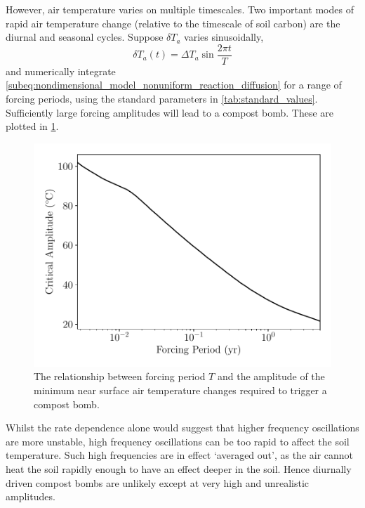 However, air temperature varies on multiple timescales. Two important modes of rapid air temperature change (relative to the timescale of soil
carbon) are the diurnal and seasonal cycles. Suppose $\delta T_a$ varies sinusoidally,
\begin{equation}
  \label{eq:sinusoidal_forcing}
  \delta T_a(t) = \Delta T_a \sin \frac{2\pi t}{T}
\end{equation}
and numerically integrate \cref{subeq:nondimensional_model_nonuniform_reaction_diffusion} for a range of
forcing periods, using the standard parameters in \cref{tab:standard_values}. Sufficiently large forcing amplitudes will lead to a compost bomb.
These are plotted in \cref{fig:forcing_frequency_vs_amplitude}.
\begin{figure}
  \centering
  \includegraphics[scale=0.5,keepaspectratio]{critical_amplitude_vs_period}
  \caption[Critical warming for periodic forcing]{The relationship between forcing period $T$ and the amplitude of the minimum near surface air temperature changes required to trigger a compost bomb.}
  \label{fig:forcing_frequency_vs_amplitude}
\end{figure}

Whilst the rate dependence alone would suggest that higher frequency oscillations are more unstable,
high frequency oscillations can be too rapid to affect the soil temperature. Such high frequencies are in effect `averaged out', as the air cannot heat the soil rapidly enough to
have an effect deeper in the soil. Hence diurnally driven compost bombs are unlikely except at very high and unrealistic amplitudes.

